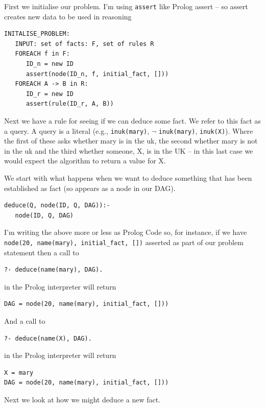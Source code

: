 \documentclass{blue-book}
\begin{document}
First we initialise our problem.  I'm using \texttt{assert} like Prolog assert -- so assert creates new data to be used in reasoning

\begin{verbatim}
INITALISE_PROBLEM:
   INPUT: set of facts: F, set of rules R
   FOREACH f in F:
      ID_n = new ID
      assert(node(ID_n, f, initial_fact, []))
   FOREACH A -> B in R:
      ID_r = new ID
      assert(rule(ID_r, A, B)) 
\end{verbatim}

Next we have a rule for seeing if we can deduce some fact.  We refer to this fact as a query.  A query is a literal (e.g., \texttt{inuk(mary)}, $\lnot$ \texttt{inuk(mary)}, \texttt{inuk(X)}). Where the first of these asks whether mary is in the uk, the second whether mary is not in the uk and the third whether someone, X, is in the UK -- in this last case we would expect the algorithm to return a value for X.

We start with what happens when we want to deduce something that has been established as fact (so appears as a node in our DAG).

\begin{verbatim}
deduce(Q, node(ID, Q, DAG)):-
   node(ID, Q, DAG)
\end{verbatim}
I'm writing the above more or less as Prolog Code so, for instance, if we have \texttt{node(20, name(mary), initial\_fact, [])} asserted as part of our problem statement then a call to

\begin{verbatim}
?- deduce(name(mary), DAG).
\end{verbatim}
in the Prolog interpreter will return

\begin{verbatim}
DAG = node(20, name(mary), initial_fact, []))
\end{verbatim}

And a call to 
\begin{verbatim}
?- deduce(name(X), DAG).
\end{verbatim}
in the Prolog interpreter will return

\begin{verbatim}
X = mary
DAG = node(20, name(mary), initial_fact, []))
\end{verbatim}

Next we look at how we might deduce a new fact.
\end{document}
